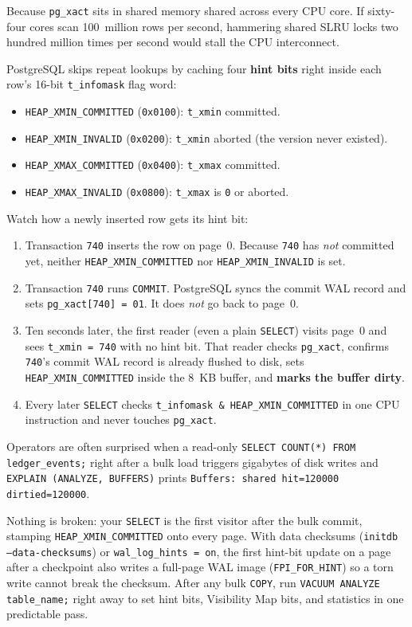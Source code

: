 Because \texttt{pg\_xact} sits in shared memory shared across every CPU core. If sixty-four cores scan 100~million rows per second, hammering shared SLRU locks two hundred million times per second would stall the CPU interconnect.

PostgreSQL skips repeat lookups by caching four \textbf{hint bits} right inside each row's 16-bit \texttt{t\_infomask} flag word:
\begin{itemize}
  \item \texttt{HEAP\_XMIN\_COMMITTED} (\texttt{0x0100}): \texttt{t\_xmin} committed.
  \item \texttt{HEAP\_XMIN\_INVALID} (\texttt{0x0200}): \texttt{t\_xmin} aborted (the version never existed).
  \item \texttt{HEAP\_XMAX\_COMMITTED} (\texttt{0x0400}): \texttt{t\_xmax} committed.
  \item \texttt{HEAP\_XMAX\_INVALID} (\texttt{0x0800}): \texttt{t\_xmax} is \texttt{0} or aborted.
\end{itemize}

Watch how a newly inserted row gets its hint bit:
\begin{enumerate}
  \item Transaction \texttt{740} inserts the row on page~0. Because \texttt{740} has \emph{not} committed yet, neither \texttt{HEAP\_XMIN\_COMMITTED} nor \texttt{HEAP\_XMIN\_INVALID} is set.
  \item Transaction \texttt{740} runs \texttt{COMMIT}. PostgreSQL syncs the commit WAL record and sets \texttt{pg\_xact[740] = 01}. It does \emph{not} go back to page~0.
  \item Ten seconds later, the first reader (even a plain \texttt{SELECT}) visits page~0 and sees \texttt{t\_xmin = 740} with no hint bit. That reader checks \texttt{pg\_xact}, confirms \texttt{740}'s commit WAL record is already flushed to disk, sets \texttt{HEAP\_XMIN\_COMMITTED} inside the 8~KB buffer, and \textbf{marks the buffer dirty}.
  \item Every later \texttt{SELECT} checks \texttt{t\_infomask \& HEAP\_XMIN\_COMMITTED} in one CPU instruction and never touches \texttt{pg\_xact}.
\end{enumerate}

\begin{trapbox}
Operators are often surprised when a read-only \texttt{SELECT COUNT(*) FROM ledger\_events;} right after a bulk load triggers gigabytes of disk writes and \texttt{EXPLAIN (ANALYZE, BUFFERS)} prints \texttt{Buffers: shared hit=120000 dirtied=120000}.

Nothing is broken: your \texttt{SELECT} is the first visitor after the bulk commit, stamping \texttt{HEAP\_XMIN\_COMMITTED} onto every page. With data checksums (\texttt{initdb --data-checksums}) or \texttt{wal\_log\_hints = on}, the first hint-bit update on a page after a checkpoint also writes a full-page WAL image (\texttt{FPI\_FOR\_HINT}) so a torn write cannot break the checksum. After any bulk \texttt{COPY}, run \texttt{VACUUM ANALYZE table\_name;} right away to set hint bits, Visibility Map bits, and statistics in one predictable pass.
\end{trapbox}

